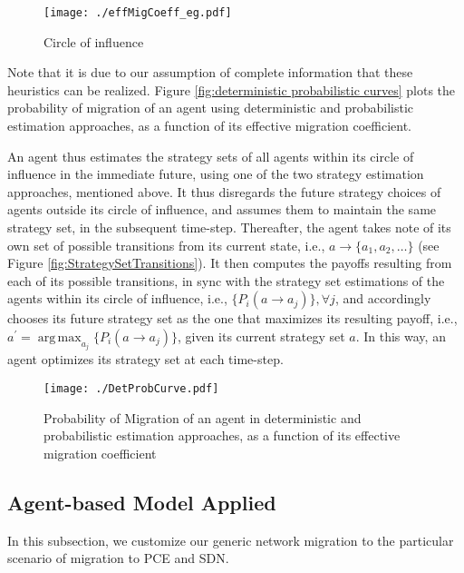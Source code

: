\documentclass[smallextended]{svjour3}
\begin{document}
\begin{figure}
\begin{center}
\texttt{[image: ./effMigCoeff\_eg.pdf]}
\caption{Circle of influence}
\label{fig:effMigCoeff example}
\end{center}
\end{figure}

\par Note that it is due to our assumption of complete information that
these heuristics can be realized. Figure \ref{fig:deterministic probabilistic
curves} plots the probability of migration of an agent using deterministic
and probabilistic estimation approaches, as a function of its effective
migration coefficient.

\par An agent thus estimates the strategy sets of all agents within its circle
of influence in the immediate future, using one of the two strategy estimation
approaches, mentioned above. It thus disregards the future strategy choices of
agents outside its circle of influence, and assumes them to maintain the same
strategy set, in the subsequent time-step. Thereafter, the agent takes note of
its own set of possible transitions from its current state, i.e., $a \to \{a_1,
a_2, \ldots\}$ (see Figure \ref{fig:StrategySetTransitions}). It then computes
the payoffs resulting from each of its possible transitions, in sync with the
strategy set estimations of the agents within its circle of influence, i.e., 
$\{P_i(a \to a_j)\},\forall j$, and accordingly chooses its future strategy set
as the one that maximizes its resulting payoff, i.e., $a^\prime =
\operatorname{arg\,max}_{a_j} \{P_i(a \to a_j)\}$, given its current strategy
set $a$.
In this way, an agent optimizes its strategy set at each time-step.

\begin{figure}
\begin{center}
\texttt{[image: ./DetProbCurve.pdf]}
\caption{Probability of Migration of an agent in deterministic and
probabilistic estimation approaches, as a function of its effective migration
coefficient}
\label{fig:deterministic probabilistic curves}
\end{center}
\end{figure}

\subsection{Agent-based Model Applied} In this subsection, we customize our
generic network migration to the particular scenario of migration to
PCE and SDN.
\end{document}
